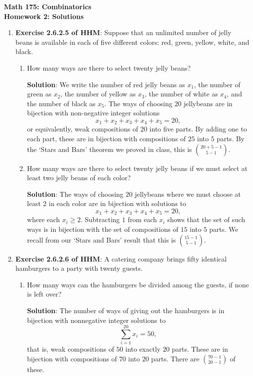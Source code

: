 \documentclass[11pt]{article}
\begin{document}
\begin{center}
{\Large \bf Math 175: Combinatorics} \\
{\Large \bf Homework 2: Solutions}\\
\end{center}

\begin{enumerate}

\item {\bf Exercise 2.6.2.5 of HHM}:  Suppose that an unlimited number of jelly beans is available in each of five different colors: red, green, yellow, white, and black.  
\begin{enumerate}
\item How many ways are there to select twenty jelly beans?

{\bf Solution}: We write the number of red jelly beans as $x_1$, the number of green as $x_2$, the number of yellow as $x_3$, the number of white as $x_4$, and the number of black as $x_5$.  The ways of choosing $20$ jellybeans are in bijection with non-negative integer solutions 
\[
x_1 + x_2 + x_3 + x_4 + x_5 = 20,
\]
or equivalently, weak compositions of $20$ into five parts.  By adding one to each part, these are in bijection with compositions of $25$ into $5$ parts.  By the `Stars and Bars' theorem we proved in class, this is $\binom{20+5-1}{5-1}$.


\item How many ways are there to select twenty jelly beans if we must select at least two jelly beans of each color?

{\bf Solution}:
The ways of choosing $20$ jellybeans where we must choose at least $2$ in each color are in bijection with solutions to 
\[
x_1 + x_2 + x_3 + x_4 + x_5 = 20,
\]
where each $x_i \ge 2$.  Subtracting $1$ from each $x_i$ shows that the set of such ways is in bijection with the set of compositions of $15$ into $5$ parts.  We recall from our `Stars and Bars' result that this is $\binom{15-1}{5-1}$.

\end{enumerate}


\item {\bf Exercise 2.6.2.6 of HHM}:
A catering company brings fifty identical hamburgers to a party with twenty guests.  
\begin{enumerate}
\item How many ways can the hamburgers be divided among the guests, if none is left over?

{\bf Solution}: The number of ways of giving out the hamburgers is in bijection with nonnegative integer solutions to 
\[
\sum_{i=1}^{20} x_i = 50,
\]
that is, weak compositions of $50$ into exactly $20$ parts.  These are in bijection with compositions of $70$ into $20$ parts.  There are $\binom{70-1}{20-1}$ of these.



\end{enumerate}
\end{enumerate}
\end{document}
